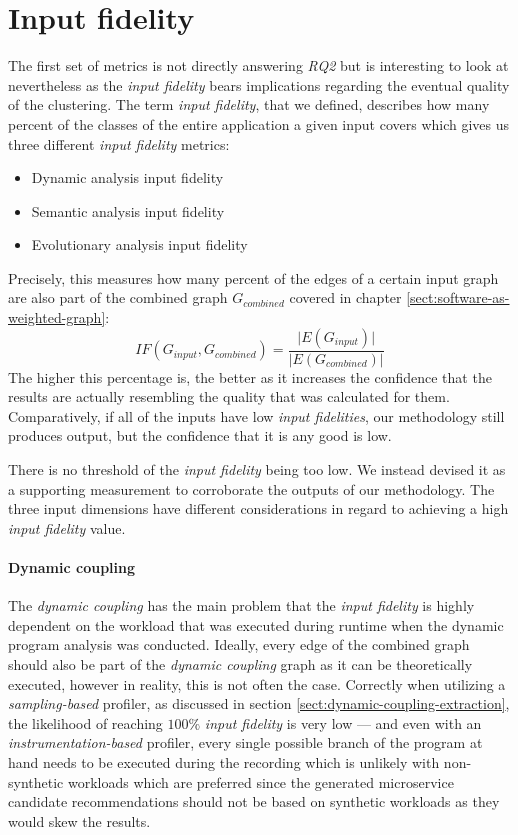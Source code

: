\documentclass[12pt,a4paper]{report}
\begin{document}
\section{Input fidelity} \label{sect:input-fidelity-metrics}

The first set of metrics is not directly answering \textit{RQ2} but is
interesting to look at nevertheless as the \textit{input fidelity} bears
implications regarding the eventual quality of the clustering. The term
\textit{input fidelity}, that we defined, describes how many percent of
the classes of the entire application a given input covers which gives us
three different \textit{input fidelity} metrics:
\begin{itemize}[noitemsep]
  \item Dynamic analysis input fidelity
  \item Semantic analysis input fidelity
  \item Evolutionary analysis input fidelity
\end{itemize}

Precisely, this measures how many percent of the edges of a certain input graph
are also part of the combined graph \(G_{combined}\) covered in chapter
\ref{sect:software-as-weighted-graph}:
\[
  IF(G_{input}, G_{combined}) = \frac{\vert E(G_{input}) \vert}{\vert E(G_{combined}) \vert}
\]
The higher this percentage
is, the better as it increases the confidence that the results are actually
resembling the quality that was calculated for them. Comparatively, if all of
the inputs have low \textit{input fidelities}, our methodology still produces
output, but the confidence that it is any good is low.

There is no threshold of the \textit{input fidelity} being too low. We instead
devised it as a supporting measurement to corroborate the outputs of our
methodology. The three input dimensions have different considerations in
regard to achieving a high \textit{input fidelity} value.

\paragraph{Dynamic coupling}
The \textit{dynamic coupling} has the main problem
that the \textit{input fidelity} is highly dependent on the workload that was
executed during runtime when the dynamic program analysis was conducted.
Ideally, every edge of the combined graph should also be part of the
\textit{dynamic coupling} graph as it can be theoretically executed,
however in reality, this is not often the case. Correctly when utilizing a
\textit{sampling\hyp based} profiler, as discussed in section
\ref{sect:dynamic-coupling-extraction}, the likelihood of reaching \(100\%\)
\textit{input fidelity} is very low --- and even with an \textit{instrumentation\hyp based}
profiler, every single possible branch of the program at hand needs to be
executed during the recording which is unlikely with non\hyp synthetic
workloads which are preferred since the generated microservice candidate
recommendations should not be based on synthetic workloads as they would skew
the results.
\end{document}
